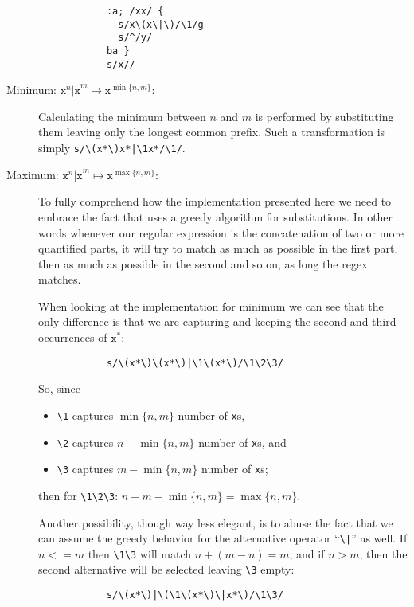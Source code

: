 \begin{description}
		\begin{Verbatim}
			:a; /xx/ {
			  s/x\(x\|\)/\1/g
			  s/^/y/
			ba }
			s/x//
		\end{Verbatim}

	\item[Minimum: $\texttt{x}^n\texttt{|x}^m \mapsto
		\texttt{x}^{\min\{n,m\}}$:]

		Calculating the minimum between $n$ and $m$ is performed by
		substituting them leaving only the longest common prefix.  Such a
		transformation is simply \verb!s/\(x*\)x*|\1x*/\1/!.

	\item[Maximum: $\texttt{x}^n\texttt{|x}^m \mapsto
		\texttt{x}^{\max\{n,m\}}$:]

		To fully comprehend how the implementation presented here
		we need to embrace the fact that \sed* uses a greedy algorithm for
		substitutions. In other words whenever our regular
		expression is the concatenation of two or more quantified parts, it
		will try to match as much as possible in the first part, then as
		much as possible in the second and so on, as long the regex matches.

		When looking at the implementation for minimum we can see that the
		only difference is that we are capturing and keeping the second and
		third occurrences of $\texttt{x}^*$:

		\begin{Verbatim}
			s/\(x*\)\(x*\)|\1\(x*\)/\1\2\3/
		\end{Verbatim}

		So, since
		\begin{itemize}
			\item \verb|\1| captures $\min\{n,m\}$ number of \verb|x|s,
			\item \verb|\2| captures $n-\min\{n,m\}$ number of \verb|x|s, and
			\item \verb|\3| captures $m-\min\{n,m\}$ number of \verb|x|s;
		\end{itemize}
		then for \verb|\1\2\3|: $n+m-\min\{n,m\}=\max\{n,m\}$.

		Another possibility, though way less elegant, is to abuse the fact
		that we can assume the greedy behavior for the alternative operator
		``\verb!\|!'' as well.  If $n<=m$ then \verb|\1\3| will match $n +
		(m-n)=m$, and if $n>m$, then the second alternative will be selected
		leaving \verb|\3| empty:
		\begin{Verbatim}
			s/\(x*\)|\(\1\(x*\)\|x*\)/\1\3/
		\end{Verbatim}


\end{description}
